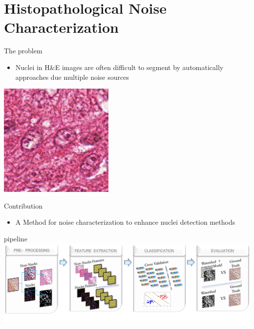 \documentclass[usenames,dvipsnames]{beamer}
\begin{document}
\section{Histopathological Noise Characterization}


\begin{frame}{The problem}

\begin{itemize}
	\item Nuclei in H&E images are often difficult to segment by automatically approaches due multiple noise sources 
\end{itemize}
\includegraphics[width=\textwidth]{images/ejemplo.png}

\end{frame}

\begin{frame}{Contribution}

\begin{itemize}
\item A Method for noise characterization to enhance nuclei detection methods
\end{itemize}


\end{frame}



\begin{frame}{pipeline}
\includegraphics[width=\textwidth]{images/pipe.png}
\end{frame}
\end{document}
